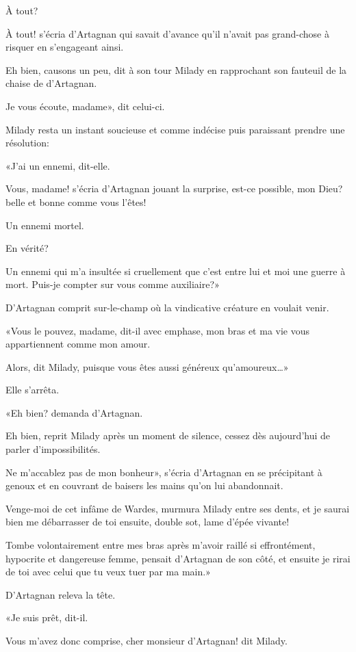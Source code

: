 \speak  À tout? 

\speak  À tout! s'écria d'Artagnan qui savait d'avance qu'il n'avait pas grand-chose à risquer en s'engageant ainsi. 

\speak  Eh bien, causons un peu, dit à son tour Milady en rapprochant son fauteuil de la chaise de d'Artagnan. 

\speak  Je vous écoute, madame», dit celui-ci. 

Milady resta un instant soucieuse et comme indécise puis paraissant prendre une résolution: 

«J'ai un ennemi, dit-elle. 

\speak  Vous, madame! s'écria d'Artagnan jouant la surprise, est-ce possible, mon Dieu? belle et bonne comme vous l'êtes! 

\speak  Un ennemi mortel. 

\speak  En vérité? 

\speak  Un ennemi qui m'a insultée si cruellement que c'est entre lui et moi une guerre à mort. Puis-je compter sur vous comme auxiliaire?» 

D'Artagnan comprit sur-le-champ où la vindicative créature en voulait venir. 

«Vous le pouvez, madame, dit-il avec emphase, mon bras et ma vie vous appartiennent comme mon amour. 

\speak  Alors, dit Milady, puisque vous êtes aussi généreux qu'amoureux\dots» 

Elle s'arrêta. 

«Eh bien? demanda d'Artagnan. 

\speak  Eh bien, reprit Milady après un moment de silence, cessez dès aujourd'hui de parler d'impossibilités. 

\speak  Ne m'accablez pas de mon bonheur», s'écria d'Artagnan en se précipitant à genoux et en couvrant de baisers les mains qu'on lui abandonnait. 

\speak  Venge-moi de cet infâme de Wardes, murmura Milady entre ses dents, et je saurai bien me débarrasser de toi ensuite, double sot, lame d'épée vivante! 

\speak  Tombe volontairement entre mes bras après m'avoir raillé si effrontément, hypocrite et dangereuse femme, pensait d'Artagnan de son côté, et ensuite je rirai de toi avec celui que tu veux tuer par ma main.» 

D'Artagnan releva la tête. 

«Je suis prêt, dit-il. 

\speak  Vous m'avez donc comprise, cher monsieur d'Artagnan! dit Milady. 

